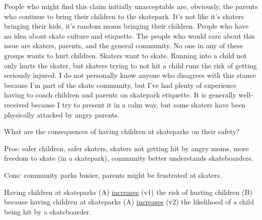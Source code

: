 \documentclass[12pt]{article}
\begin{document}
People who might find this claim initially unacceptable are, obviously, the parents who continue to bring their children to the skatepark. It's not like it's skaters bringing their kids, it's random moms bringing their children. People who have no idea about skate culture and etiquette. The people who would care about this issue are skaters, parents, and the general community. No one in any of these groups wants to hurt children. Skaters want to skate. Running into a child not only hurts the skater, but skaters trying to not hit a child runs the risk of getting seriously injured. I do not personally know anyone who disagrees with this stance because I'm part of the skate community, but I've had plenty of experience having to coach children and parents on skatepark etiquette. It is generally well-received because I try to present it in a calm way, but some skaters have been physically attacked by angry parents.


What are the consequences of having children at skateparks on their safety?

Pros: safer children, safer skaters, skaters not getting hit by angry moms, more freedom to skate (in a skatepark), community better understands skateboarders.

Cons: community parks busier, parents might be frustrated at skaters.

Having children at skateparks (A) \uline{increases} (v1) the risk of hurting children (B) because having children at skateparks (A) \uline{increases} (v2) the likelihood of a child being hit by a skateboarder.

\end{document}
